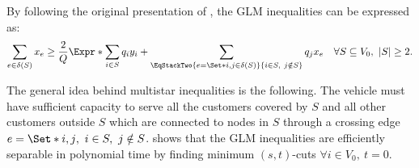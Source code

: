 By following the original presentation of \textcite{jepsen2014},
the GLM inequalities can be expressed as:
\begin{equation}
	\label{eq:cptp-glm-inequality}
	\sum\limits_{e \in \delta(S)} x_e \ge \frac{2}{Q} \Expr*{
		\sum\limits_{i \in S} q_i y_i +
		\sum\limits_{\EqStackTwo{e = \Set*{i, j} \in \delta(S)}{i \in S,\ j \notin S}} q_j x_e
	}
	\quad \forall S \subseteq V_0,\ |S| \ge 2.
\end{equation}

The general idea behind multistar inequalities is the following.
The vehicle must have sufficient capacity to serve
all the customers covered by $S$
and all other customers outside $S$ which
are connected to nodes in $S$ through a crossing edge $e = \Set*{i, j},\ i \in S,\ j \notin S$.
\textcite{letchford2006} shows that the GLM inequalities are efficiently separable in
polynomial time by finding minimum $(s, t)$-cuts $\forall i \in V_0,\ t = 0$.
